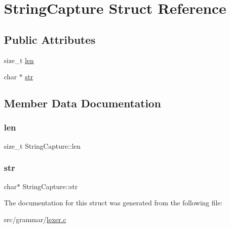 \hypertarget{structStringCapture}{}\section{String\+Capture Struct Reference}
\label{structStringCapture}
\subsection*{Public Attributes}
\begin{DoxyCompactItemize}
\item 
size\+\_\+t \hyperlink{structStringCapture_aac78ea7d97b7221dca0c618bb0b85e8a}{len}
\item 
char $\ast$ \hyperlink{structStringCapture_a308b12940e09fabe3d3595a658045391}{str}
\end{DoxyCompactItemize}


\subsection{Member Data Documentation}
\hypertarget{structStringCapture_aac78ea7d97b7221dca0c618bb0b85e8a}{}\label{structStringCapture_aac78ea7d97b7221dca0c618bb0b85e8a} 
\subsubsection{\texorpdfstring{len}{len}}
{\footnotesize\ttfamily size\+\_\+t String\+Capture\+::len}

\hypertarget{structStringCapture_a308b12940e09fabe3d3595a658045391}{}\label{structStringCapture_a308b12940e09fabe3d3595a658045391} 
\subsubsection{\texorpdfstring{str}{str}}
{\footnotesize\ttfamily char$\ast$ String\+Capture\+::str}



The documentation for this struct was generated from the following file\+:\begin{DoxyCompactItemize}
\item 
src/grammar/\hyperlink{lexer_8c}{lexer.\+c}\end{DoxyCompactItemize}

